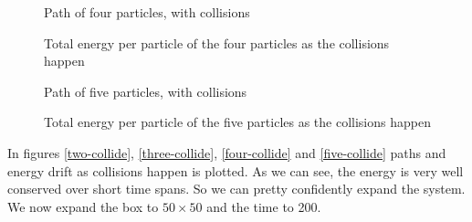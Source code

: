 \documentclass[10pt,a4paper,aps,twocolumn,secnumarabic,numerical,balancelastpage,nofootinbib,superscriptaddress]{revtex4-2}
\begin{document}
		\begin{figure*}[htb]
			\centering
			\begin{subfigure}{.45\textwidth}
				\hspace*{-2cm}\scalebox{0.8}{}
				\caption{Path of four particles, with collisions}
			\end{subfigure}
			\begin{subfigure}{.45\textwidth}
				\scalebox{0.6}{}
				\caption{Total energy per particle of the four particles as the collisions happen}
			\end{subfigure}
			\caption{\label{four-collide}Four particles over a short time scale}
		\end{figure*}
		
		\begin{figure*}[htb]
			\centering
			\begin{subfigure}{.45\textwidth}
				\hspace*{-2cm}\scalebox{0.8}{}
				\caption{Path of five particles, with collisions}
			\end{subfigure}
			\begin{subfigure}{.45\textwidth}
				\scalebox{0.6}{}
				\caption{Total energy per particle of the five particles as the collisions happen}
			\end{subfigure}
			\caption{\label{five-collide}Five particles over a short time scale}
		\end{figure*}
		In figures \ref{two-collide}, \ref{three-collide}, \ref{four-collide} and \ref{five-collide} paths and energy drift as collisions happen is plotted. As we can see, the energy is very well conserved over short time spans. So we can pretty confidently expand the system. We now expand the box to $50\times50$ and the time to 200.
		
\end{document}
